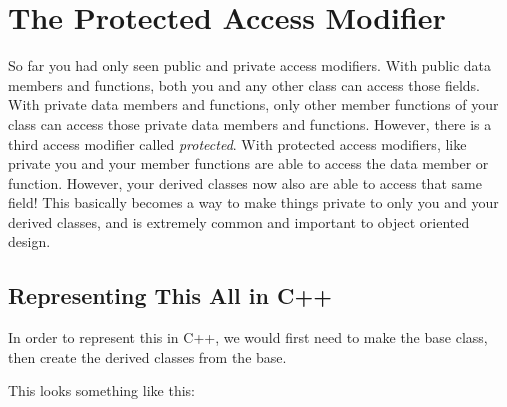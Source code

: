 \documentclass{tufte-handout}
\begin{document}
\section{The Protected Access Modifier}
So far you had only seen public and private access modifiers.
With public data members and functions, both you and any other class can access those fields.
With private data members and functions, only other member functions of your class can access those private data members and functions.
However, there is a third access modifier called \textit{protected}.
With protected access modifiers, like private you and your member functions are able to access the data member or function.
However, your derived classes now also are able to access that same field!
This basically becomes a way to make things private to only you and your derived classes, and is extremely common and important to object oriented design.

\subsection{Representing This All in C++}
In order to represent this in C++, we would first need to make the  base class, then create the derived classes from the  base.

This looks something like this:
\end{document}
